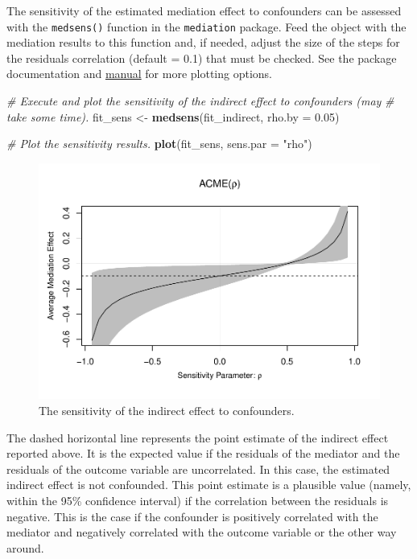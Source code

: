 \documentclass[doc,floatsintext]{apa6}
\newenvironment{Shaded}{\begin{snugshade}}{\end{snugshade}}
\newcommand{\KeywordTok}[1]{\textcolor[rgb]{0.13,0.29,0.53}{\textbf{#1}}}
\newcommand{\DataTypeTok}[1]{\textcolor[rgb]{0.13,0.29,0.53}{#1}}
\newcommand{\FloatTok}[1]{\textcolor[rgb]{0.00,0.00,0.81}{#1}}
\newcommand{\StringTok}[1]{\textcolor[rgb]{0.31,0.60,0.02}{#1}}
\newcommand{\CommentTok}[1]{\textcolor[rgb]{0.56,0.35,0.01}{\textit{#1}}}
\newcommand{\NormalTok}[1]{#1}
\begin{document}
The sensitivity of the estimated mediation effect to confounders can be
assessed with the \texttt{medsens()} function in the \texttt{mediation}
package. Feed the object with the mediation results to this function
and, if needed, adjust the size of the steps for the residuals
correlation (default = 0.1) that must be checked. See the package
documentation and
\href{https://web.mit.edu/teppei/www/research/mediationR.pdf}{manual}
for more plotting options.

\begin{Shaded}
\begin{Highlighting}[]
\CommentTok{# Execute and plot the sensitivity of the indirect effect to confounders (may}
\CommentTok{# take some time).}
\NormalTok{fit_sens <-}\StringTok{ }\KeywordTok{medsens}\NormalTok{(fit_indirect, }\DataTypeTok{rho.by =} \FloatTok{0.05}\NormalTok{)}

\CommentTok{# Plot the sensitivity results.}
\KeywordTok{plot}\NormalTok{(fit_sens, }\DataTypeTok{sens.par =} \StringTok{"rho"}\NormalTok{)}
\end{Highlighting}
\end{Shaded}

\begin{figure}[H]
\centering
\includegraphics{HelpMyCollaboratorUsesR_files/figure-latex/mediation1sensitivity-1.pdf}
\caption{\label{fig:mediation1sensitivity}The sensitivity of the indirect
effect to confounders.}
\end{figure}

The dashed horizontal line represents the point estimate of the indirect
effect reported above. It is the expected value if the residuals of the
mediator and the residuals of the outcome variable are uncorrelated. In
this case, the estimated indirect effect is not confounded. This point
estimate is a plausible value (namely, within the 95\% confidence
interval) if the correlation between the residuals is negative. This is
the case if the confounder is positively correlated with the mediator
and negatively correlated with the outcome variable or the other way
around.
\end{document}
